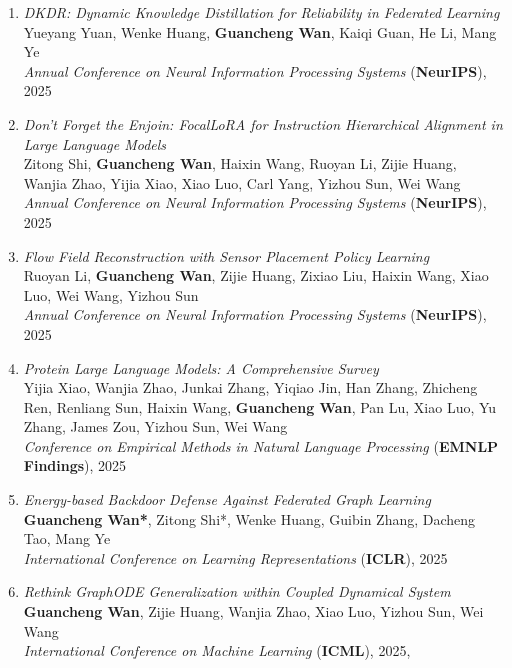 \begin{enumerate}
    \item \textit{DKDR: Dynamic Knowledge Distillation for Reliability in Federated Learning} \\
    Yueyang Yuan, Wenke Huang, \textbf{Guancheng Wan}, Kaiqi Guan, He Li, Mang Ye \\
    \hfill \textit{Annual Conference on Neural Information Processing Systems} (\textbf{NeurIPS}), 2025

    \item \textit{Don't Forget the Enjoin: FocalLoRA for Instruction Hierarchical Alignment in Large Language Models} \\
    Zitong Shi, \textbf{Guancheng Wan}, Haixin Wang, Ruoyan Li, Zijie Huang, Wanjia Zhao, Yijia Xiao, Xiao Luo, Carl Yang, Yizhou Sun, Wei Wang \\
    \hfill \textit{Annual Conference on Neural Information Processing Systems} (\textbf{NeurIPS}), 2025

    \item \textit{Flow Field Reconstruction with Sensor Placement Policy Learning} \\
    Ruoyan Li, \textbf{Guancheng Wan}, Zijie Huang, Zixiao Liu, Haixin Wang, Xiao Luo, Wei Wang, Yizhou Sun \\
    \hfill \textit{Annual Conference on Neural Information Processing Systems} (\textbf{NeurIPS}), 2025

    \item \textit{Protein Large Language Models: A Comprehensive Survey} \\
    Yijia Xiao, Wanjia Zhao, Junkai Zhang, Yiqiao Jin, Han Zhang, Zhicheng Ren, Renliang Sun, Haixin Wang, \textbf{Guancheng Wan}, Pan Lu, Xiao Luo, Yu Zhang, James Zou, Yizhou Sun, Wei Wang \\
    \hfill \textit{Conference on Empirical Methods in Natural Language Processing} (\textbf{EMNLP Findings}), 2025

    \item \textit{Energy-based Backdoor Defense Against Federated Graph Learning} \\
    \textbf{Guancheng Wan*}, Zitong Shi*, Wenke Huang, Guibin Zhang, Dacheng Tao, Mang Ye \\
    \hfill \textit{International Conference on Learning Representations} (\textbf{ICLR}), 2025 {}
    
    \item \textit{Rethink GraphODE Generalization within Coupled Dynamical System} \\
    \textbf{Guancheng Wan}, Zijie Huang, Wanjia Zhao, Xiao Luo, Yizhou Sun, Wei Wang \\
    \hfill \textit{International Conference on Machine Learning} (\textbf{ICML}), 2025, {}


\end{enumerate}
